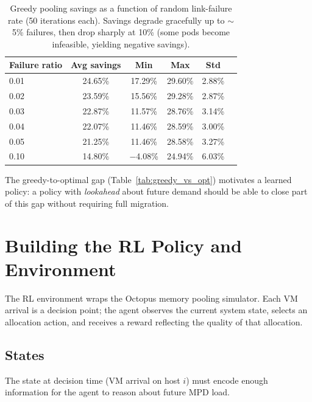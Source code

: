 \documentclass[11pt]{article}
\begin{document}
\begin{table}[H]
\centering
\small
\begin{tabular}{lccccc}
\toprule
\textbf{Failure ratio} & \textbf{Avg savings} & \textbf{Min} & \textbf{Max} & \textbf{Std} \\
\midrule
0.01 & 24.65\% & 17.29\% & 29.60\% & 2.88\% \\
0.02 & 23.59\% & 15.56\% & 29.28\% & 2.87\% \\
0.03 & 22.87\% & 11.57\% & 28.76\% & 3.14\% \\
0.04 & 22.07\% & 11.46\% & 28.59\% & 3.00\% \\
0.05 & 21.25\% & 11.46\% & 28.58\% & 3.27\% \\
0.10 & 14.80\% & $-$4.08\% & 24.94\% & 6.03\% \\
\bottomrule
\end{tabular}
\caption{Greedy pooling savings as a function of random link-failure rate
(50 iterations each).  Savings degrade gracefully up to $\sim$5\% failures,
then drop sharply at 10\% (some pods become infeasible, yielding negative
savings).}
\label{tab:failures}
\end{table}

The greedy-to-optimal gap (Table~\ref{tab:greedy_vs_opt}) motivates a
learned policy: a policy with \emph{lookahead} about future demand should
be able to close part of this gap without requiring full migration.

\section{Building the RL Policy and Environment}

The RL environment wraps the Octopus memory pooling simulator.  Each VM
arrival is a decision point; the agent observes the current system state,
selects an allocation action, and receives a reward reflecting the quality of
that allocation.

\subsection{States}
\label{sec:states}

The state at decision time (VM arrival on host $i$) must encode enough
information for the agent to reason about future MPD load.
\end{document}

